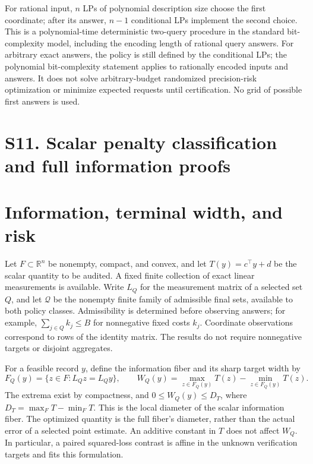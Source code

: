 For rational input, $n$ LPs of polynomial description size choose the first
coordinate; after its answer, $n-1$ conditional LPs implement the second
choice. This is a polynomial-time deterministic two-query procedure in the
standard bit-complexity model, including the encoding length of rational
query answers. For arbitrary exact answers, the policy is still defined by
the conditional LPs; the polynomial bit-complexity statement applies to
rationally encoded inputs and answers. It does not solve arbitrary-budget
randomized precision-risk optimization or minimize expected requests until
certification. No grid of possible first answers is used.
\section{S11. Scalar penalty classification and full information proofs}
\section{Information, terminal width, and risk}
\label{sec:risk_setup}
Let $F\subset\mathbb R^n$ be nonempty, compact, and convex, and let
$T(y)=c^\top y+d$ be the scalar quantity to be audited. A fixed finite
collection of exact linear measurements is available. Write $L_Q$ for
the measurement matrix of a selected set $Q$, and let $\mathcal Q$ be
the nonempty finite family of admissible final sets, available to both
policy classes. Admissibility is determined before observing answers; for example,
$\sum_{j\in Q}k_j\le B$ for nonnegative fixed costs $k_j$.
Coordinate observations correspond to rows of the identity matrix.
The results do not require nonnegative targets or disjoint aggregates.

For a feasible record $y$, define the information fiber and its sharp
target width by
\begin{equation}
 F_Q(y)=\{z\in F:L_Qz=L_Qy\},\qquad
 W_Q(y)=\max_{z\in F_Q(y)}T(z)-\min_{z\in F_Q(y)}T(z).
 \label{eq:risk_fiber}
\end{equation}
The extrema exist by compactness, and $0\le W_Q(y)\le D_T$, where
$D_T=\max_F T-\min_F T$. This is the local diameter of the
scalar information fiber. The optimized quantity is the full fiber's
diameter, rather than the actual error of a selected point estimate.
An additive constant in $T$ does
not affect $W_Q$. In particular, a paired squared-loss contrast is
affine in the unknown verification targets and fits this formulation.

